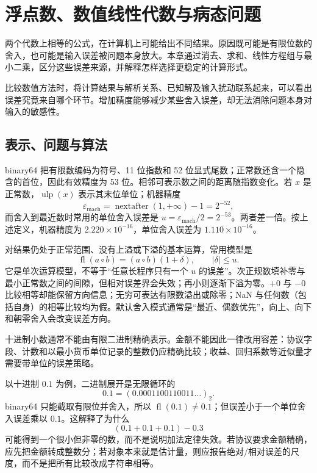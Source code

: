 \chapter{浮点数、数值线性代数与病态问题}
\label{ch:numerical-stability}

两个代数上相等的公式，在计算机上可能给出不同结果。原因既可能是有限位数的舍入，也可能是输入误差被问题本身放大。本章通过消去、求和、线性方程组与最小二乘，区分这些误差来源，并解释怎样选择更稳定的计算形式。

比较数值方法时，将计算结果与解析关系、已知解及输入扰动联系起来，可以看出误差究竟来自哪个环节。增加精度能够减少某些舍入误差，却无法消除问题本身对输入的敏感性。

\section{表示、问题与算法}

binary64 把有限数编码为符号、11 位指数和 52 位显式尾数；正常数还含一个隐含的首位，因此有效精度为 53 位。相邻可表示数之间的距离随指数变化。若 $x$ 是正常数，$\operatorname{ulp}(x)$ 表示其末位单位；机器精度
\[
  \varepsilon_{\mathrm{mach}}=\operatorname{nextafter}(1,+\infty)-1=2^{-52},
\]
而舍入到最近数时常用的单位舍入误差是 $u=\varepsilon_{\mathrm{mach}}/2=2^{-53}$。两者差一倍。按上述定义，机器精度为 $2.220\times10^{-16}$，单位舍入误差为 $1.110\times10^{-16}$。

对结果仍处于正常范围、没有上溢或下溢的基本运算，常用模型是
\[
  \operatorname{fl}(a\circ b)=(a\circ b)(1+\delta),\qquad |\delta|\le u.
\]
它是单次运算模型，不等于“任意长程序只有一个 $u$ 的误差”。次正规数填补零与最小正常数之间的间隙，但相对误差界会失效；再小则逐渐下溢为零。$+0$ 与 $-0$ 比较相等却能保留方向信息；无穷可表达有限数溢出或除零；NaN 与任何数（包括自身）的相等比较均为假。默认舍入模式通常是“最近、偶数优先”，向上、向下和朝零舍入会改变误差方向。

十进制小数通常不能由有限二进制精确表示。金额不能因此一律改用容差：协议字段、计数和以最小货币单位记录的整数仍应精确比较；收益、回归系数等近似量才需要带单位的误差策略。


以十进制 $0.1$ 为例，二进制展开是无限循环的
\[
  0.1=(0.0001100110011\ldots)_2.
\]
binary64 只能截取有限位并舍入，所以 $\operatorname{fl}(0.1)\ne0.1$；但误差小于一个单位舍入误差乘以 $0.1$。这解释了为什么
\[
  (0.1+0.1+0.1)-0.3
\]
可能得到一个很小但非零的数，而不是说明加法定律失效。若协议要求金额精确，应先把金额转成整数分；若对象本来就是估计量，则应报告绝对/相对误差的尺度，而不是把所有比较改成字符串相等。

